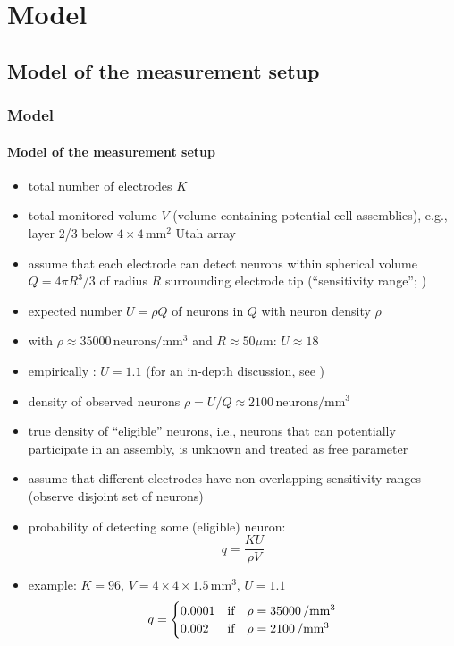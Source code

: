 \documentclass[8pt,t,usepdftitle=false]{beamer}
\begin{document}
\def\ttl{Model}
\section{\ttl}
\def\sttl{Model of the measurement setup}
\subsection{\sttl}
\begin{frame}[plain]
  \frametitle{\ttl}
  \framesubtitle{\sttl}
  \begin{itemize}
  \item<1-> total number of electrodes $K$ 
  \item<1-> total monitored volume $V$ (volume containing potential cell assemblies), e.g., layer 2/3 below $4\times{}4\,\text{mm}^2$ Utah array
  \item<2-> assume that each electrode can detect neurons within spherical volume $Q=4\pi{}R^3/3$ of radius $R$ surrounding electrode tip (``sensitivity range''; {\tiny\color{gray}\cite{Henze00_390,Pettersen08_784}})
  \item<3->[$\curvearrowright$] expected number $U=\rho{}Q$ of neurons in $Q$ with neuron density $\rho$
  \item<4-> with $\rho\approx{}35000\,\text{neurons}/\text{mm}^3$ {\tiny\color{gray}\parencite{Beul17}}
    and $R\approx{}50\mu\text{m}$: $U\approx{}18$
  \item<5-> empirically {\tiny\color{gray}\parencite{Riehle13_48}}: $U=1.1$
    {\tiny\color{gray}(for an in-depth discussion, see \cite{Shoham06_777})}
  \item<5->[$\curvearrowright$] density of observed neurons $\rho=U/Q\approx{}2100\,\text{neurons}/\text{mm}^3$
  \item<6-> true density of ``eligible'' neurons, i.e., neurons that can potentially participate in an assembly, is unknown and treated as free parameter
  \item<7-> assume that different electrodes have non-overlapping sensitivity ranges (observe disjoint set of neurons)
  \item<7-> probability of detecting some (eligible) neuron:
    \begin{equation*}
      q=\frac{KU}{\rho{}V}
    \end{equation*}
  \item <8-> example: $K=96$, $V=4\times{}4\times{}1.5\,\text{mm}^3$, $U=1.1$
    \begin{equation*}
      q=
      \begin{cases}
        0.0001 & \text{if\quad} \rho=35000\,/\text{mm}^3\\
        0.002 & \text{if\quad} \rho=2100\,/\text{mm}^3
      \end{cases}
    \end{equation*}
  \end{itemize}
\end{frame}
\def\sttl{Minimal assembly model}
\end{document}

